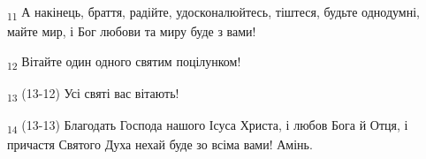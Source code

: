 \begin{tcolorbox}
\textsubscript{11} А накінець, браття, радійте, удосконалюйтесь, тіштеся, будьте однодумні, майте мир, і Бог любови та миру буде з вами!
\end{tcolorbox}
\begin{tcolorbox}
\textsubscript{12} Вітайте один одного святим поцілунком!
\end{tcolorbox}
\begin{tcolorbox}
\textsubscript{13} (13-12) Усі святі вас вітають!
\end{tcolorbox}
\begin{tcolorbox}
\textsubscript{14} (13-13) Благодать Господа нашого Ісуса Христа, і любов Бога й Отця, і причастя Святого Духа нехай буде зо всіма вами! Амінь.
\end{tcolorbox}
